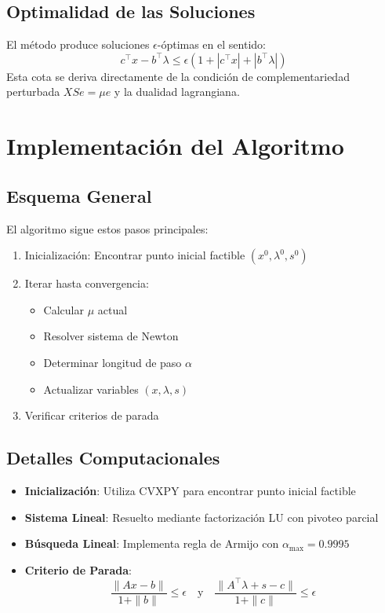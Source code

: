 \documentclass{article}
\begin{document}
\subsection{Optimalidad de las Soluciones}
El método produce soluciones $\epsilon$-óptimas en el sentido:
\[
c^\top x - b^\top \lambda \leq \epsilon(1 + |c^\top x| + |b^\top \lambda|)
\]
Esta cota se deriva directamente de la condición de complementariedad perturbada $XSe = \mu e$ y la dualidad lagrangiana.

\section{Implementación del Algoritmo}

\subsection{Esquema General}
El algoritmo sigue estos pasos principales:
\begin{enumerate}
\item Inicialización: Encontrar punto inicial factible $(x^0, \lambda^0, s^0)$
\item Iterar hasta convergencia:
  \begin{itemize}
  \item Calcular $\mu$ actual
  \item Resolver sistema de Newton
  \item Determinar longitud de paso $\alpha$
  \item Actualizar variables $(x, \lambda, s)$
  \end{itemize}
\item Verificar criterios de parada
\end{enumerate}

\subsection{Detalles Computacionales}
\begin{itemize}
\item \textbf{Inicialización}: Utiliza CVXPY para encontrar punto inicial factible
\item \textbf{Sistema Lineal}: Resuelto mediante factorización LU con pivoteo parcial
\item \textbf{Búsqueda Lineal}: Implementa regla de Armijo con $\alpha_{\max} = 0.9995$
\item \textbf{Criterio de Parada}: 
\[
\frac{\|Ax - b\|}{1 + \|b\|} \leq \epsilon \quad \text{y} \quad \frac{\|A^\top \lambda + s - c\|}{1 + \|c\|} \leq \epsilon
\]
\end{itemize}
\end{document}
